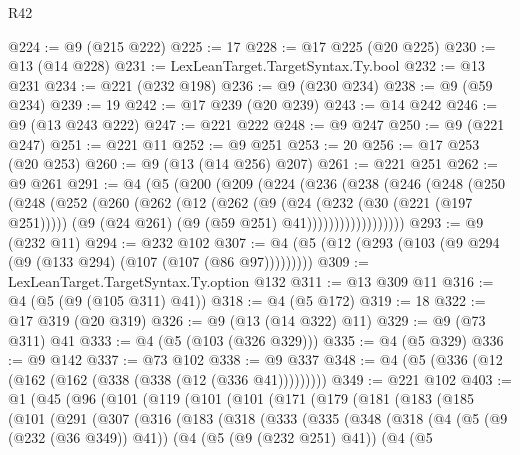 \begin{lexlean}{R42}
\begin{coremodule}
@224 := @9 (@215 @222)
@225 := 17
@228 := @17 @225 (@20 @225)
@230 := @13 (@14 @228)
@231 := LexLeanTarget.TargetSyntax.Ty.bool
@232 := @13 @231
@234 := @221 (@232 @198)
@236 := @9 (@230 @234)
@238 := @9 (@59 @234)
@239 := 19
@242 := @17 @239 (@20 @239)
@243 := @14 @242
@246 := @9 (@13 @243 @222)
@247 := @221 @222
@248 := @9 @247
@250 := @9 (@221 @247)
@251 := @221 @11
@252 := @9 @251
@253 := 20
@256 := @17 @253 (@20 @253)
@260 := @9 (@13 (@14 @256) @207)
@261 := @221 @251
@262 := @9 @261
@291 := @4
    (@5
      (@200
        (@209
          (@224
            (@236
              (@238
                (@246
                  (@248
                    (@250
                      (@248
                        (@252
                          (@260
                            (@262
                              (@12
                                (@262
                                  (@9
                                    (@24 (@232 (@30 (@221 (@197 @251)))))
                                    (@9 (@24 @261) (@9 (@59 @251) @41))))))))))))))))))
@293 := @9 (@232 @11)
@294 := @232 @102
@307 := @4 (@5 (@12 (@293 (@103 (@9 @294 (@9 (@133 @294) (@107 (@107 (@86 @97)))))))))
@309 := LexLeanTarget.TargetSyntax.Ty.option @132
@311 := @13 @309 @11
@316 := @4 (@5 (@9 (@105 @311) @41))
@318 := @4 (@5 @172)
@319 := 18
@322 := @17 @319 (@20 @319)
@326 := @9 (@13 (@14 @322) @11)
@329 := @9 (@73 @311) @41
@333 := @4 (@5 (@103 (@326 @329)))
@335 := @4 (@5 @329)
@336 := @9 @142
@337 := @73 @102
@338 := @9 @337
@348 := @4 (@5 (@336 (@12 (@162 (@162 (@338 (@338 (@12 (@336 @41)))))))))
@349 := @221 @102
@403 := @1
    (@45
      (@96
        (@101
          (@119
            (@101
              (@101
                (@171
                  (@179
                    (@181
                      (@183
                        (@185
                          (@101
                            (@291
                              (@307
                                (@316
                                  (@183
                                    (@318
                                      (@333
                                        (@335
                                          (@348
                                            (@318
                                              (@4
                                                (@5 (@9 (@232 (@36 @349)) @41))
                                                (@4
                                                  (@5 (@9 (@232 @251) @41))
                                                  (@4
                                                    (@5

\end{coremodule}
\end{lexlean}
